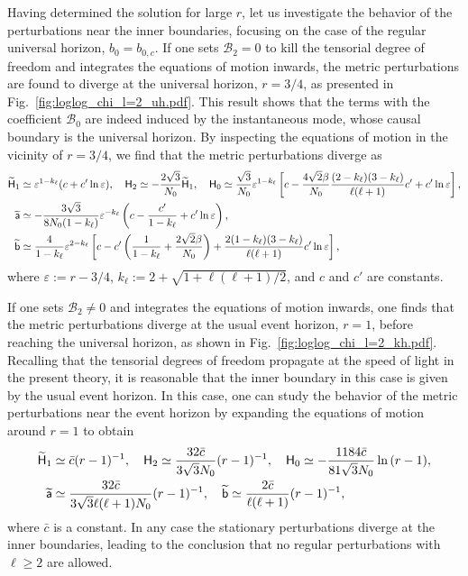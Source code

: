 \documentclass[aps,prd,preprintnumbers,superscriptaddress,nofootinbib,notitlepage]{revtex4-2}
\begin{document}
Having determined the solution for large $r$, let us investigate the behavior of the perturbations near the inner boundaries, focusing on the case of the regular universal horizon, $b_0=b_{0,c}$.
If one sets $\mathcal{B}_2=0$ to kill the tensorial degree of freedom and integrates the equations of motion inwards, the metric perturbations are found to diverge at the universal horizon, $r=3/4$, as presented in Fig.~\ref{fig:loglog_chi_l=2_uh.pdf}.
This result shows that the terms with the coefficient $\mathcal{B}_0$ are indeed induced by the instantaneous mode, whose causal boundary is the universal horizon.
By inspecting the equations of motion in the vicinity of $r=3/4$, we find that the metric perturbations diverge as
\begin{align}
    \widetilde{\mathsf{H}}_1&\simeq \varepsilon^{1-k_\ell}(c+c'\ln\varepsilon),
    \quad  
    \mathsf{H}_2\simeq -\frac{2\sqrt{3}}{N_0}\widetilde{\mathsf{H}}_1,
    \quad 
    \mathsf{H}_0\simeq \frac{\sqrt{3}}{N_0}\varepsilon^{1-k_\ell}\left[
        c-\frac{4\sqrt{2}\beta}{N_0}\frac{(2-k_\ell)(3-k_\ell)}{\ell(\ell+1)}c'
        +c'\ln\varepsilon
        \right],\notag 
    \\ 
    \widetilde{\mathsf{a}}&\simeq -\frac{3\sqrt{3}}{8N_0(1-k_\ell)}\varepsilon^{-k_\ell}\left(
        c-\frac{c'}{1-k_\ell}+c'\ln\varepsilon
    \right),\notag 
    \\
    \widetilde{\mathsf{b}}&\simeq \frac{4}{1-k_\ell}\varepsilon^{2-k_\ell}\left[
        c-c'\left(\frac{1}{1-k_\ell}+\frac{2\sqrt{2}\beta}{N_0}\right)
        +\frac{2(1-k_\ell)(3-k_\ell)}{\ell(\ell+1)}c'\ln\varepsilon
    \right],
\end{align}
where $\varepsilon:=r-3/4$, $k_\ell:=2+\sqrt{1+\ell(\ell+1)/2}$,
and $c$ and $c'$ are constants.




If one sets $\mathcal{B}_2\neq 0$ and integrates the equations of motion inwards, one finds that the metric perturbations diverge at the usual event horizon, $r=1$, before reaching the universal horizon, as shown in Fig.~\ref{fig:loglog_chi_l=2_kh.pdf}.
Recalling that the tensorial degrees of freedom propagate at the speed of light in the present theory, it is reasonable that the inner boundary in this case is given by the usual event horizon.
In this case, one can study the behavior of the metric perturbations near the event horizon
by expanding the equations of motion around $r=1$ to obtain
\begin{align}
    \widetilde{\mathsf{H}}_1&\simeq \bar{c}(r-1)^{-1},\quad 
    \mathsf{H}_2\simeq  \frac{32\bar{c}}{3\sqrt{3}N_0}(r-1)^{-1},\quad 
    \mathsf{H}_0\simeq %
    -\frac{1184\bar{c}}{81\sqrt{3}N_0}\ln{(r-1)},\notag \\
    \widetilde{\mathsf{a}}&\simeq \frac{32\bar{c}}{3\sqrt{3}\ell(\ell+1)N_0}(r-1)^{-1},\quad 
    \widetilde{\mathsf{b}}\simeq \frac{2\bar{c}}{\ell(\ell+1)}(r-1)^{-1},
\end{align}
where $\bar c$ is a constant.
In any case the stationary perturbations diverge at the inner boundaries,
leading to the conclusion that no regular perturbations with $\ell\ge 2$ are allowed.
\end{document}
